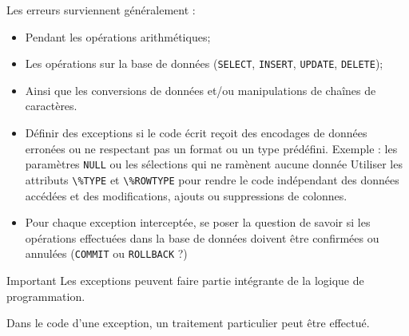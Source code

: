 \documentclass[10pt]{beamer}
\begin{document}
\begin{frame}{\secname}
    Les erreurs surviennent généralement :
    \begin{itemize}
        \item Pendant les opérations arithmétiques;
        \item Les opérations sur la base de données (\lstinline[language=plsql]!SELECT!, \lstinline[language=plsql]!INSERT!, \lstinline[language=plsql]!UPDATE!, \lstinline[language=plsql]!DELETE!);
        \item Ainsi que les conversions de données et/ou manipulations de chaînes de caractères.
    \end{itemize}
\end{frame}

\begin{frame}{\secname}
    \begin{itemize}
        \item Définir des exceptions si le code écrit reçoit des encodages de données erronées ou ne respectant pas un format ou un type prédéfini.  Exemple : les paramètres \lstinline[language=plsql]!NULL! ou les sélections qui ne ramènent aucune donnée
              Utiliser les attributs \lstinline[language=plsql]!\%TYPE! et \lstinline[language=plsql]!\%ROWTYPE! pour rendre le code indépendant des données accédées et des modifications, ajouts ou suppressions de colonnes.
        \item Pour chaque exception interceptée, se poser la question de savoir si les opérations effectuées dans la base de données doivent être confirmées ou annulées (\lstinline[language=plsql]!COMMIT! ou \lstinline[language=plsql]!ROLLBACK! ?)
    \end{itemize}
\end{frame}

\begin{frame}{\secname}
    \begin{alertblock}{Important}
        Les exceptions peuvent faire partie intégrante de la logique de programmation.
    \end{alertblock}
    Dans le code d'une exception, un traitement particulier peut être effectué.
\end{frame}

\begin{frame}{\secname}
    
\end{frame}
\end{document}
